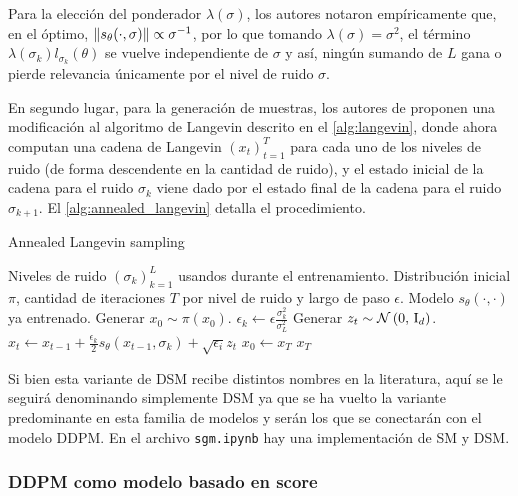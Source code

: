 Para la elección del ponderador $\lambda(\sigma)$, los autores notaron empíricamente que, en el óptimo, $\left\lVert s_\theta(\cdot, \sigma) \right\rVert\propto \sigma^{-1}$, por lo que tomando $\lambda(\sigma) = \sigma^2$, el término $\lambda(\sigma_k) l_{\sigma_k}(\theta)$ se vuelve independiente de $\sigma$ y así, ningún sumando de $L$ gana o pierde relevancia únicamente por el nivel de ruido $\sigma$.

En segundo lugar, para la generación de muestras, los autores de \cite{song2020generative} proponen una modificación al algoritmo de Langevin descrito en el \autoref{alg:langevin}, donde ahora computan una cadena de Langevin $(x_t)_{t=1}^T$ para cada uno de los niveles de ruido (de forma descendente en la cantidad de ruido), y el estado inicial de la cadena para el ruido $\sigma_k$ viene dado por el estado final de la cadena para el ruido $\sigma_{k+1}$. El \autoref{alg:annealed_langevin} detalla el procedimiento.

\begin{algorithm}
    \caption{Annealed Langevin sampling}
    \label{alg:annealed_langevin}
    \begin{algorithmic}[1]
        \Require Niveles de ruido $(\sigma_k)_{k=1}^L$ usandos durante el entrenamiento.
        \Require Distribución inicial $\pi$, cantidad de iteraciones $T$ por nivel de ruido y largo de paso $\epsilon$.
        \Require Modelo $s_\theta(\cdot,\cdot)$ ya entrenado.
        \State Generar $x_0\sim \pi(x_0)$.
        \State $\epsilon_k \gets \epsilon \frac{\sigma_k^2}{\sigma_L^2}$  
        \State Generar $z_t\sim \mathcal{N}\left(0,\,\operatorname{I}_{d}\right)$.
        \State $x_t\gets x_{t-1} + \frac{\epsilon_k}{2}s_\theta(x_{t-1},\sigma_k) + \sqrt{\epsilon_i} z_t$
        \EndFor
        \State $x_0\gets x_T$
        \EndFor
        \State\Return $x_T$
    \end{algorithmic}
\end{algorithm}

Si bien esta variante de DSM recibe distintos nombres en la literatura, aquí se le seguirá denominando simplemente DSM ya que se ha vuelto la variante predominante en esta familia de modelos y serán los que se conectarán con el modelo DDPM. En el archivo \texttt{sgm.ipynb} hay una implementación de SM y DSM.

\subsubsection{DDPM como modelo basado en score}

